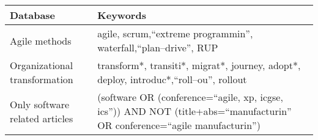 \centering
{} \label{keywords table}
\begin{tabular}{l p{30em}}
    \bfseries{Database} & \bfseries{Keywords} \\
    \hline
    Agile methods & agile, scrum,``extreme programmin'', waterfall,``plan–drive'', RUP \\
    Organizational transformation & transform*, transiti*, migrat*, journey, adopt*, deploy, introduc*,``roll–ou'', rollout \\
    Only software related articles & (software OR (conference=``agile, xp, icgse, ics'')) AND NOT (title+abs=``manufacturin'' OR conference=``agile manufacturin'') \\
    \hline
\end{tabular}

\justify
